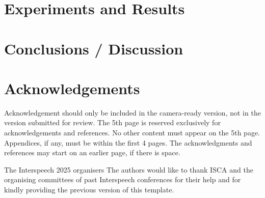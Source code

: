 \documentclass{Interspeech}
\begin{document}
\section{Experiments and Results}
\label{sec:experiments_results}

\section{Conclusions / Discussion}
\label{sec:conclusions}

\section{Acknowledgements}
Acknowledgement should only be included in the camera-ready version, not in the
version submitted for review. The 5th page is reserved exclusively for
acknowledgements and references. No other content must appear on the 5th page.
Appendices, if any, must be within the first 4 pages. The acknowledgments and
references may start on an earlier page, if there is space.

\ifinterspeechfinal
  The Interspeech 2025 organisers
\else
  The authors
\fi
would like to thank ISCA and the organising committees of past Interspeech conferences for their help and for kindly providing the previous version of this template.



\end{document}
